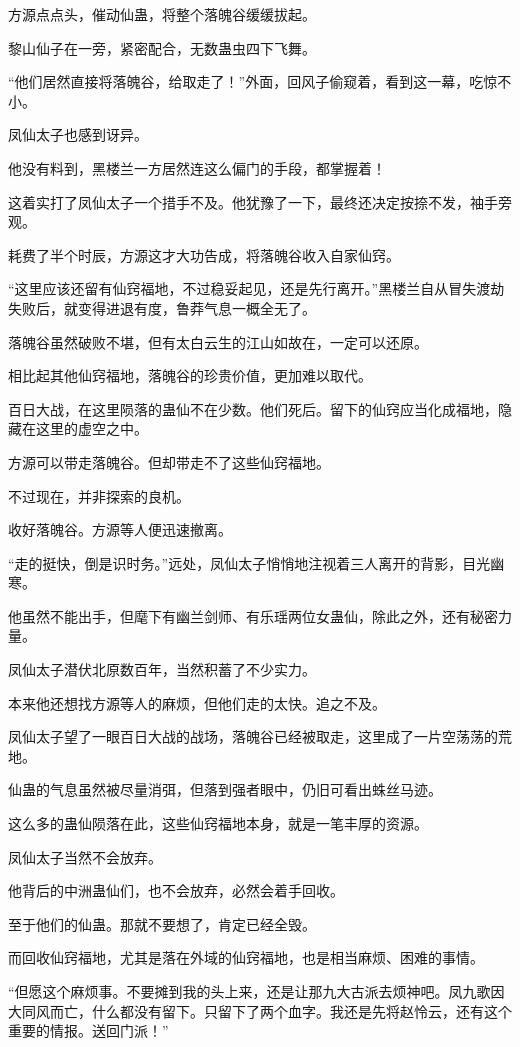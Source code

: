 \begin{this_body}
方源点点头，催动仙蛊，将整个落魄谷缓缓拔起。

黎山仙子在一旁，紧密配合，无数蛊虫四下飞舞。

“他们居然直接将落魄谷，给取走了！”外面，回风子偷窥着，看到这一幕，吃惊不小。

凤仙太子也感到讶异。

他没有料到，黑楼兰一方居然连这么偏门的手段，都掌握着！

这着实打了凤仙太子一个措手不及。他犹豫了一下，最终还决定按捺不发，袖手旁观。

耗费了半个时辰，方源这才大功告成，将落魄谷收入自家仙窍。

“这里应该还留有仙窍福地，不过稳妥起见，还是先行离开。”黑楼兰自从冒失渡劫失败后，就变得进退有度，鲁莽气息一概全无了。

落魄谷虽然破败不堪，但有太白云生的江山如故在，一定可以还原。

相比起其他仙窍福地，落魄谷的珍贵价值，更加难以取代。

百日大战，在这里陨落的蛊仙不在少数。他们死后。留下的仙窍应当化成福地，隐藏在这里的虚空之中。

方源可以带走落魄谷。但却带走不了这些仙窍福地。

不过现在，并非探索的良机。

收好落魄谷。方源等人便迅速撤离。

“走的挺快，倒是识时务。”远处，凤仙太子悄悄地注视着三人离开的背影，目光幽寒。

他虽然不能出手，但麾下有幽兰剑师、有乐瑶两位女蛊仙，除此之外，还有秘密力量。

凤仙太子潜伏北原数百年，当然积蓄了不少实力。

本来他还想找方源等人的麻烦，但他们走的太快。追之不及。

凤仙太子望了一眼百日大战的战场，落魄谷已经被取走，这里成了一片空荡荡的荒地。

仙蛊的气息虽然被尽量消弭，但落到强者眼中，仍旧可看出蛛丝马迹。

这么多的蛊仙陨落在此，这些仙窍福地本身，就是一笔丰厚的资源。

凤仙太子当然不会放弃。

他背后的中洲蛊仙们，也不会放弃，必然会着手回收。

至于他们的仙蛊。那就不要想了，肯定已经全毁。

而回收仙窍福地，尤其是落在外域的仙窍福地，也是相当麻烦、困难的事情。

“但愿这个麻烦事。不要摊到我的头上来，还是让那九大古派去烦神吧。凤九歌因大同风而亡，什么都没有留下。只留下了两个血字。我还是先将赵怜云，还有这个重要的情报。送回门派！”


\end{this_body}
